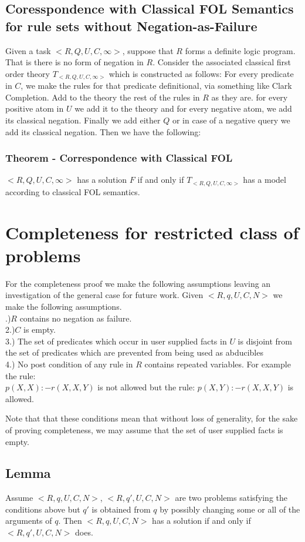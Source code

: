 \documentclass{article}
\begin{document}
\subsection{Coresspondence with Classical FOL Semantics for rule sets without Negation-as-Failure}
Given a task $<R,Q,U,C,\infty>$, suppose that $R$ forms a definite logic program. That is there is no form of negation in $R$. Consider the associated classical first order theory $T_{<R,Q,U,C,\infty>}$ which is constructed as follows: For every predicate in $C$, we make the rules for that predicate definitional, via something like Clark Completion. Add to the theory the rest of the rules in $R$ as they are. for every positive atom in $U$ we add it to the theory and for every negative atom, we add its classical negation. Finally we add either $Q$ or in case of a negative query we add its classical negation. Then we have the following:
\subsubsection{Theorem - Correspondence with Classical FOL}
$<R,Q,U,C,\infty>$ has a solution $F$ if and only if $T_{<R,Q,U,C,\infty>}$ has a model according to classical FOL semantics.


\section{Completeness for restricted class of problems}
For the completeness proof we make the following assumptions leaving an investigation of the general case for future work. Given $<R,q,U,C,N>$ we make the following assumptions.\\
.)$R$ contains no negation as failure.\\
2.)$C$ is empty.\\
3.) The set of predicates which occur in user supplied facts in $U$ is disjoint from the set of predicates which are prevented from being used as abducibles\\
4.) No post condition of any rule in $R$ contains repeated variables. For example the rule:\\
$p(X,X):-r(X,X,Y)$ is not allowed but the rule: $p(X,Y):-r(X,X,Y)$ is allowed.

Note that that these conditions mean that without loss of generality, for the sake of proving completeness, we may assume that the set of user supplied facts is empty.

\subsection{Lemma}
Assume $<R,q,U,C,N>$, $<R,q',U,C,N>$ are two problems satisfying the conditions above but $q'$ is obtained from $q$ by possibly changing some or all of the arguments of $q$. Then $<R,q,U,C,N>$ has a solution if and only if $<R,q',U,C,N>$ does.
\end{document}
